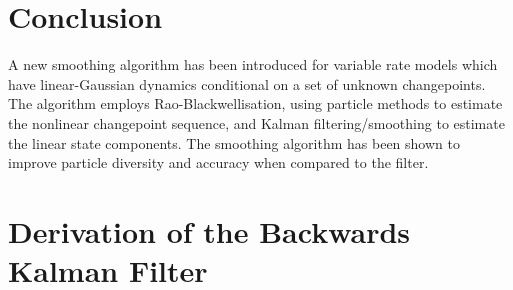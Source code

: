 \documentclass[journal]{IEEEtran}
\begin{document}
%





\section{Conclusion}
A new smoothing algorithm has been introduced for variable rate models which have linear-Gaussian dynamics conditional on a set of unknown changepoints. The algorithm employs Rao-Blackwellisation, using particle methods to estimate the nonlinear changepoint sequence, and Kalman filtering/smoothing to estimate the linear state components. The smoothing algorithm has been shown to improve particle diversity and accuracy when compared to the filter.








\appendices
\section{Derivation of the Backwards Kalman Filter} \label{app:backward_filter}
\end{document}
